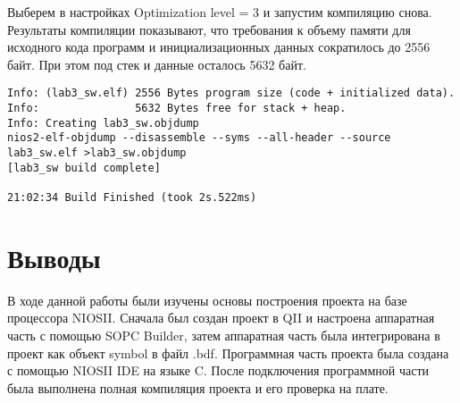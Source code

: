 Выберем в настройках Optimization level = 3 и запустим компиляцию снова. Результаты компиляции показывают, что требования к объему памяти для исходного кода программ и инициализационных данных сократилось до 2556 байт. При этом под стек и данные осталось 5632 байт.
\begin{lstlisting}[caption=Результаты компиляции, style=console]
Info: (lab3_sw.elf) 2556 Bytes program size (code + initialized data).
Info:               5632 Bytes free for stack + heap.
Info: Creating lab3_sw.objdump
nios2-elf-objdump --disassemble --syms --all-header --source lab3_sw.elf >lab3_sw.objdump
[lab3_sw build complete]

21:02:34 Build Finished (took 2s.522ms)
\end{lstlisting}

\section{Выводы}

В ходе данной работы были изучены основы построения проекта на базе процессора NIOSII. Сначала был создан проект в QII и настроена аппаратная часть с помощью SOPC Builder, затем аппаратная часть была интегрирована в проект как объект symbol в файл .bdf. Программная часть проекта была создана с помощью NIOSII IDE на языке C. После подключения программной части была выполнена полная компиляция проекта и его проверка на плате. 

